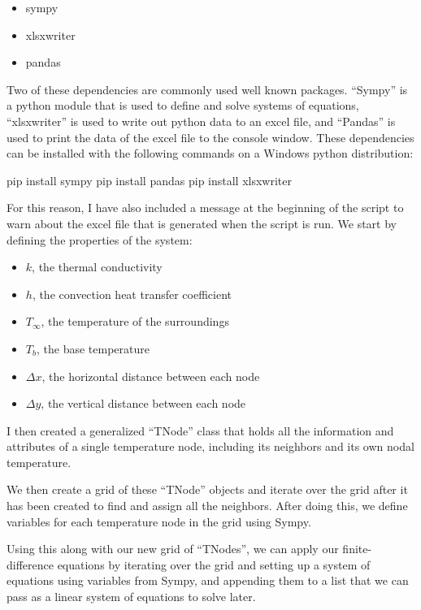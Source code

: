 \documentclass[12pt, stu, floatsintext, hidelinks]{apa7}
\begin{document}
\begin{itemize}
	\item sympy
	\item xlsxwriter
	\item pandas
\end{itemize}

Two of these dependencies are commonly used well known packages. ``Sympy'' is a python module that is used to define and solve systems of equations, ``xlsxwriter'' is used to write out python data to an excel file, and ``Pandas'' is used to print the data of the excel file to the console window. These dependencies can be installed with the following commands on a Windows python distribution:

\begin{python}
pip install sympy
pip install pandas
pip install xlsxwriter
\end{python}

For this reason, I have also included a message at the beginning of the script to warn about the excel file that is generated when the script is run. We start by defining the properties of the system:

\begin{itemize}
	\item $k$, the thermal conductivity
	\item $h$, the convection heat transfer coefficient
	\item $T_{\infty}$, the temperature of the surroundings
	\item $T_b$, the base temperature
	\item $\Delta x$, the horizontal distance between each node
	\item $\Delta y$, the vertical distance between each node
\end{itemize}

I then created a generalized ``TNode'' class that holds all the information and attributes of a single temperature node, including its neighbors and its own nodal temperature.

We then create a grid of these ``TNode'' objects and iterate over the grid after it has been created to find and assign all the neighbors. After doing this, we define variables for each temperature node in the grid using Sympy.

Using this along with our new grid of ``TNodes'', we can apply our finite-difference equations by iterating over the grid and setting up a system of equations using variables from Sympy, and appending them to a list that we can pass as a linear system of equations to solve later.
\end{document}
